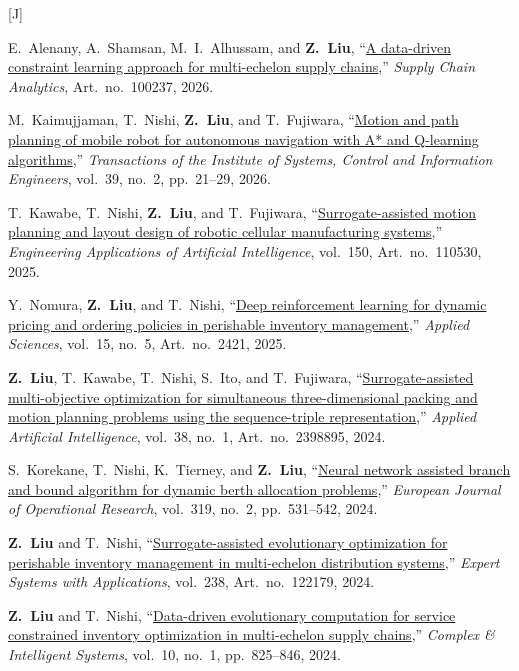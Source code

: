 \documentclass[11pt,a4paper]{article}
\newcommand{\doititle}[2]{\href{https://doi.org/#1}{#2}}
\newlength{\datecol}
\newcounter{pubno}
\newenvironment{publist}[1]{%
  \begin{list}{[#1\arabic{pubno}]}{%
    \usecounter{pubno}%
    \setlength{\leftmargin}{\datecol}%
    \setlength{\labelwidth}{\datecol}%
    \setlength{\labelsep}{0pt}%
    \setlength{\itemsep}{3pt}%
    \setlength{\parsep}{0pt}%
    \setlength{\topsep}{2pt}%
    \renewcommand{\makelabel}[1]{##1\hfil}}}%
  {\end{list}}
\begin{document}
\begin{publist}{J}
\item E.~Alenany, A.~Shamsan, M.~I.~Alhussam, and \textbf{Z.~Liu}, ``\doititle{10.1016/j.sca.2026.100237}{A data-driven constraint learning approach for multi-echelon supply chains},'' \textit{Supply Chain Analytics}, Art.~no.~100237, 2026.
\item M.~Kaimujjaman, T.~Nishi, \textbf{Z.~Liu}, and T.~Fujiwara, ``\doititle{10.5687/iscie.39.21}{Motion and path planning of mobile robot for autonomous navigation with {A}* and {Q}-learning algorithms},'' \textit{Transactions of the Institute of Systems, Control and Information Engineers}, vol.~39, no.~2, pp.~21--29, 2026.
\item T.~Kawabe, T.~Nishi, \textbf{Z.~Liu}, and T.~Fujiwara, ``\doititle{10.1016/j.engappai.2025.110530}{Surrogate-assisted motion planning and layout design of robotic cellular manufacturing systems},'' \textit{Engineering Applications of Artificial Intelligence}, vol.~150, Art.~no.~110530, 2025.
\item Y.~Nomura, \textbf{Z.~Liu}, and T.~Nishi, ``\doititle{10.3390/app15052421}{Deep reinforcement learning for dynamic pricing and ordering policies in perishable inventory management},'' \textit{Applied Sciences}, vol.~15, no.~5, Art.~no.~2421, 2025.
\item \textbf{Z.~Liu}, T.~Kawabe, T.~Nishi, S.~Ito, and T.~Fujiwara, ``\doititle{10.1080/08839514.2024.2398895}{Surrogate-assisted multi-objective optimization for simultaneous three-dimensional packing and motion planning problems using the sequence-triple representation},'' \textit{Applied Artificial Intelligence}, vol.~38, no.~1, Art.~no.~2398895, 2024.
\item S.~Korekane, T.~Nishi, K.~Tierney, and \textbf{Z.~Liu}, ``\doititle{10.1016/j.ejor.2024.06.040}{Neural network assisted branch and bound algorithm for dynamic berth allocation problems},'' \textit{European Journal of Operational Research}, vol.~319, no.~2, pp.~531--542, 2024.
\item \textbf{Z.~Liu} and T.~Nishi, ``\doititle{10.1016/j.eswa.2023.122179}{Surrogate-assisted evolutionary optimization for perishable inventory management in multi-echelon distribution systems},'' \textit{Expert Systems with Applications}, vol.~238, Art.~no.~122179, 2024.
\item \textbf{Z.~Liu} and T.~Nishi, ``\doititle{10.1007/s40747-023-01179-0}{Data-driven evolutionary computation for service constrained inventory optimization in multi-echelon supply chains},'' \textit{Complex \& Intelligent Systems}, vol.~10, no.~1, pp.~825--846, 2024.

\end{publist}
\end{document}
